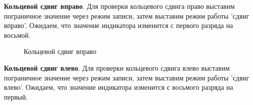 \textbf{Кольцевой сдвиг вправо}. Для проверки кольцевого сдвига право выставим пограничное значение 
через режим записи, затем выставим режим работы 'сдвиг вправо'. Ожидаем, что значение индикатора 
изменится с первого разряда на восьмой.

\begin{figure}[H]
    \centering
    \hspace{30mm}
    \caption{Кольцевой сдвиг вправо}
\end{figure}

\textbf{Кольцевой сдвиг влево}. Для проверки кольцевого сдвига влево выставим пограничное значение 
через режим записи, затем выставим режим работы 'сдвиг влево'. Ожидаем, что значение индикатора 
изменится с восьмого разряда на первый.

